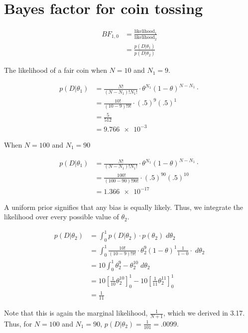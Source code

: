 \documentclass{article}
\begin{document}
\section{Bayes factor for coin tossing}

\begin{align*}
  BF_{1,0} &= \frac{\text{likelihood}_1}{\text{likelihood}_2} \\
          &= \frac{p(D|\theta_1)}{p(D|\theta_2)}
\end{align*}

The likelihood of a fair coin when $N = 10$ and $N_1 = 9$.

\begin{align*}
  p(D|\theta_1) &= \frac{N!}{(N-N_1)!N_1!} \cdot \theta^{N_1}(1 - \theta)^{N - N_1} \cdot \\
                &= \frac{10!}{(10-9)!9!} \cdot (.5)^9(.5)^1 \\
                &= \frac{5}{512} \\
                &= \num{9.766e-3}
\end{align*}

When $N = 100$ and $N_1 = 90$

\begin{align*}
  p(D|\theta_1) &= \frac{N!}{(N-N_1)!N_1!} \cdot \theta^{N_1}(1 - \theta)^{N - N_1} \cdot \\
                &= \frac{100!}{(100-90)!90!} \cdot (.5)^{90}(.5)^{10} \\
                &= \num{1.366e-17}
\end{align*}

A uniform prior signifies that any bias is equally likely. Thus, we
integrate the likelihood over every possible value of $\theta_2$.

\begin{align*}
  p(D|\theta_2) &= \int_0^1 p(D|\theta_2) \cdot p(\theta_2) \;
                  d\theta_2 \\
                &= \int_0^1 \frac{10!}{(10-9)!9!} \cdot \theta_2^9 (1
                  - \theta)^1 \frac{1}{1 - 0}\cdot \; d\theta_2 \\
                &= 10 \int_0^1 \theta_2^9 - \theta_2^{10} \; d\theta_2 \\
                &= 10 \left[\frac{1}{10} \theta_2^{10} \right]_0^1 -
                  10 \left[\frac{1}{11} \theta_2^{11} \right]_0^1 \\
                &= \frac{1}{11}
\end{align*}

Note that this is again the marginal likelihood, $\frac{1}{N+1}$, which we derived in
3.17. Thus, for $N = 100$ and $N_1 = 90$, $p(D|\theta_2) =
\frac{1}{101} = .0099$.
\end{document}
